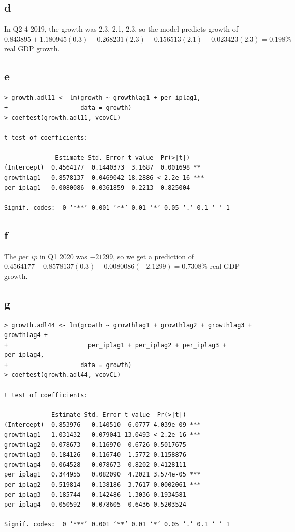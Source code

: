 \documentclass[12pt,letterpaper]{article}
\theoremstyle{definition}
\begin{document}
\subsection*{d}

In Q2-4 2019, the growth was 2.3, 2.1, 2.3, so the model predicts growth of $0.843895 + 1.180945(0.3) - 0.268231(2.3)  - 0.156513(2.1) - 0.023423(2.3) = 0.198\%$ real GDP growth.

\subsection*{e}

\begin{Verbatim}[fontsize=\small]
> growth.adl11 <- lm(growth ~ growthlag1 + per_iplag1,
+                    data = growth)
> coeftest(growth.adl11, vcovCL)

t test of coefficients:

              Estimate Std. Error t value  Pr(>|t|)
(Intercept)  0.4564177  0.1440373  3.1687  0.001698 **
growthlag1   0.8578137  0.0469042 18.2886 < 2.2e-16 ***
per_iplag1  -0.0080086  0.0361859 -0.2213  0.825004
---
Signif. codes:  0 ‘***’ 0.001 ‘**’ 0.01 ‘*’ 0.05 ‘.’ 0.1 ‘ ’ 1
\end{Verbatim}

\subsection*{f}

The $per\_ip$ in Q1 2020 was $-21299$, so we get a prediction of $0.4564177 + 0.8578137(0.3) - 0.0080086(-2.1299) = 0.7308\%$ real GDP growth.

\subsection*{g}

\begin{Verbatim}[fontsize=\small]
> growth.adl44 <- lm(growth ~ growthlag1 + growthlag2 + growthlag3 + growthlag4 +
+                      per_iplag1 + per_iplag2 + per_iplag3 + per_iplag4,
+                    data = growth)
> coeftest(growth.adl44, vcovCL)

t test of coefficients:

             Estimate Std. Error t value  Pr(>|t|)
(Intercept)  0.853976   0.140510  6.0777 4.039e-09 ***
growthlag1   1.031432   0.079041 13.0493 < 2.2e-16 ***
growthlag2  -0.078673   0.116970 -0.6726 0.5017675
growthlag3  -0.184126   0.116740 -1.5772 0.1158876
growthlag4  -0.064528   0.078673 -0.8202 0.4128111
per_iplag1   0.344955   0.082090  4.2021 3.574e-05 ***
per_iplag2  -0.519814   0.138186 -3.7617 0.0002061 ***
per_iplag3   0.185744   0.142486  1.3036 0.1934581
per_iplag4   0.050592   0.078605  0.6436 0.5203524
---
Signif. codes:  0 ‘***’ 0.001 ‘**’ 0.01 ‘*’ 0.05 ‘.’ 0.1 ‘ ’ 1
\end{Verbatim}
\end{document}
